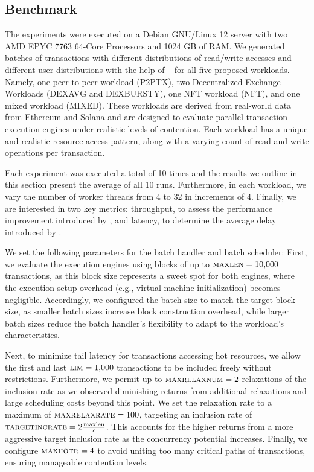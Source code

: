 \subsection{Benchmark}

The experiments were executed on a Debian GNU/Linux 12 server with two AMD EPYC 7763 64-Core Processors and 1024 GB of RAM. We generated batches of transactions with different distributions of read/write-accesses and different user distributions with the help of \basesys~\cite{chiron} for all five proposed workloads. Namely, one peer-to-peer workload (P2PTX), two Decentralized Exchange Workloads (DEXAVG and DEXBURSTY), one NFT workload (NFT), and one mixed workload (MIXED). 
These workloads are derived from real-world data from Ethereum and Solana and are designed to evaluate parallel transaction execution engines under realistic levels of contention. 
Each workload has a unique and realistic resource access pattern, along with a varying count of read and write operations per transaction.

Each experiment was executed a total of 10 times and the results we outline in this section present the average of all 10 runs. Furthermore, in each workload, we vary the number of worker threads from 4 to 32 in increments of 4.
Finally, we are interested in two key metrics: throughput, to assess the performance improvement introduced by \sys, and latency, to determine the average delay introduced by \sys.


We set the following parameters for the batch handler and batch scheduler:
First, we evaluate the execution engines using blocks of up to $\textsc{maxlen} = 10{,}000$ transactions, as this block size represents a sweet spot for both engines, where the execution setup overhead (e.g., virtual machine initialization) becomes negligible. Accordingly, we configured the batch size to match the target block size, as smaller batch sizes increase block construction overhead, while larger batch sizes reduce the batch handler's flexibility to adapt to the workload's characteristics.

Next, to minimize tail latency for transactions accessing hot resources, we allow the first and last $\textsc{lim} = 1{,}000$ transactions to be included freely without restrictions.  
Furthermore, we permit up to $\textsc{maxrelaxnum} = 2$ relaxations of the inclusion rate as we observed diminishing returns from additional relaxations and large scheduling costs beyond this point.  
We set the relaxation rate to a maximum of $\textsc{maxrelaxrate} = 100$, targeting an inclusion rate of $\textsc{targetincrate} = 2\frac{\text{maxlen}}{c}$. This accounts for the higher returns from a more aggressive target inclusion rate as the concurrency potential increases.  
Finally, we configure $\textsc{maxhotr} = 4$ to avoid uniting too many critical paths of transactions, ensuring manageable contention levels.




